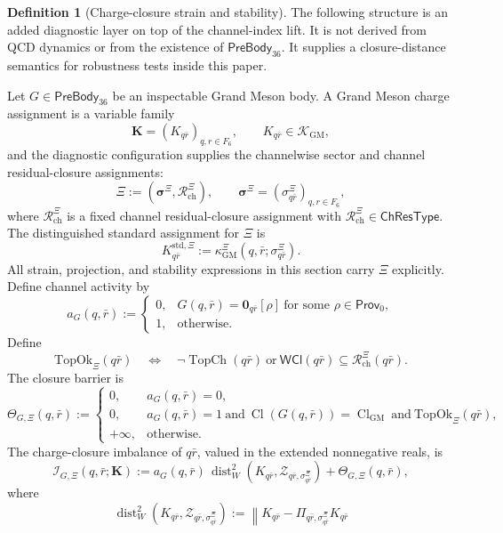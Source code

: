 \documentclass[11pt]{article}
\theoremstyle{definition}
\newtheorem{definition}{Definition}
\theoremstyle{plain}
\DeclareMathOperator{\Cl}{Cl}
\DeclareMathOperator{\TopCh}{TopCh}
\DeclareMathOperator{\dist}{dist}
\begin{document}
\begin{definition}[Charge-closure strain and stability]
The following structure is an added diagnostic layer on top of the
channel-index lift.  It is not derived from QCD dynamics or from the
existence of \(\mathsf{PreBody}_{36}\).  It supplies a closure-distance
semantics for robustness tests inside this paper.

Let \(G\in\mathsf{PreBody}_{36}\) be an inspectable Grand Meson body.  A
Grand Meson charge
assignment is a variable family
\[
  \mathbf K=(K_{q\bar r})_{q,r\in F_6},
  \qquad
  K_{q\bar r}\in\mathcal K_{\mathrm{GM}},
 \]
and the diagnostic configuration supplies the channelwise sector and
channel residual-closure assignments:
\[
  \Xi:=(\boldsymbol\sigma^\Xi,\mathcal R^\Xi_{\mathrm{ch}}),
  \qquad
  \boldsymbol\sigma^\Xi=(\sigma^\Xi_{q\bar r})_{q,r\in F_6},
\]
where \(\mathcal R^\Xi_{\mathrm{ch}}\) is a fixed channel residual-closure
assignment with \(\mathcal R^\Xi_{\mathrm{ch}}\in\mathsf{ChResType}\).
The distinguished standard assignment for \(\Xi\) is
\[
  K^{\mathrm{std},\Xi}_{q\bar r}
  :=
  \kappa_{\mathrm{GM}}^{\Xi}(q,\bar r;\sigma^\Xi_{q\bar r}).
\]
All strain, projection, and stability expressions in this section carry
\(\Xi\) explicitly.
Define channel activity by
\[
  a_G(q,\bar r)
  :=
  \begin{cases}
    0, & G(q,\bar r)=\mathbf 0_{q\bar r}[\rho]
      \ \text{for some }\rho\in\mathsf{Prov}_0,\\
    1, & \text{otherwise}.
  \end{cases}
\]
Define
\[
  \mathrm{TopOk}_{\Xi}(q\bar r)
  \quad\Longleftrightarrow\quad
  \neg\TopCh(q\bar r)
  \ \text{or}\
  \mathsf{WCl}(q\bar r)\subseteq\mathcal R^\Xi_{\mathrm{ch}}(q\bar r).
\]
The closure barrier is
\[
  \Theta_{G,\Xi}(q,\bar r)
  :=
  \begin{cases}
    0, & a_G(q,\bar r)=0,\\
    0,
      & a_G(q,\bar r)=1
        \ \text{and}\
        \Cl(G(q,\bar r))=\Cl_{\mathrm{GM}}
        \ \text{and}\
        \mathrm{TopOk}_{\Xi}(q\bar r),\\
    +\infty, & \text{otherwise}.
  \end{cases}
\]
The charge-closure imbalance of \(q\bar r\), valued in the extended
nonnegative reals, is
\[
  \mathcal I_{G,\Xi}(q,\bar r;\mathbf K)
  :=
  a_G(q,\bar r)\,
  \dist_W^2(K_{q\bar r},\mathcal Z_{q\bar r,\sigma^\Xi_{q\bar r}})
  +
  \Theta_{G,\Xi}(q,\bar r),
\]
where
\[
  \dist_W^2(K_{q\bar r},\mathcal Z_{q\bar r,\sigma^\Xi_{q\bar r}})
  :=
  \left\|
    K_{q\bar r}-\Pi_{q\bar r,\sigma^\Xi_{q\bar r}}K_{q\bar r}
\]
\end{definition}
\end{document}
